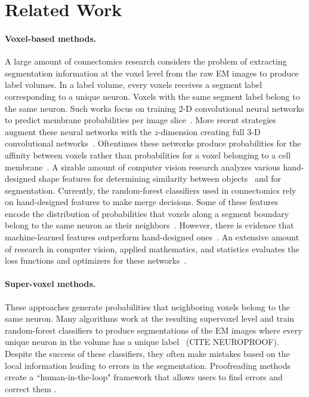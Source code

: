 \section{Related Work}

\paragraph{Voxel-based methods.} 
A large amount of connectomics research considers the problem of extracting segmentation information at the voxel level from the raw EM images to produce label volumes.
In a label volume, every voxels receives a segment label corresponding to a unique neuron.
Voxels with the same segment label belong to the same neuron. 
Such works focus on training 2-D convolutional neural networks to predict membrane probabilities per image slice~\cite{ciresan2012deep,jain2010boundary,amelio_segmentation,rhoananet,kaynig2015large}. 
More recent strategies augment these neural networks with the $z$-dimension creating full 3-D convolutional networks~\cite{lee2015recursive}.
Oftentimes these networks produce probabilities for the affinity between voxels rather than probabilities for a voxel belonging to a cell membrane~\cite{ronneberger2015u}. 
A sizable amount of computer vision research analyzes various hand-designed shape features for determining similarity between objects~\cite{osada2002shape} and for segmentation\cite{conners1984segmentation}. 
Currently, the random-forest classifiers used in connectomics rely on hand-designed features to make merge decisions.
Some of these features encode the distribution of probabilities that voxels along a segment boundary belong to the same neuron as their neighbors~\cite{nunez2014graph,ren2003learning}.
However, there is evidence that machine-learned features outperform hand-designed ones~\cite{bogovic2013learned}.
An extensive amount of research in computer vision, applied mathematics, and statistics evaluates the loss functions and optimizers for these networks~\cite{chatfield2014return,maas2013rectifier,nesterov1983method}. 

\paragraph{Super-voxel methods.} 
These approaches generate probabilities that neighboring voxels belong to the same neuron.
Many algorithms work at the resulting supervoxel level and train random-forest classifiers to produce segmentations of the EM images where every unique neuron in the volume has a unique label~\cite{seymour2016rhoananet,nunez2014graph,parag2017anisotropic,zlateski2015image} (CITE NEUROPROOF). 
Despite the success of these classifiers, they often make mistakes based on the local information leading to errors in the segmentation. 
Proofreading methods create a ``human-in-the-loop" framework that allows users to find errors and correct them \cite{haehn2017scalable,haehn2017guided,haehn2014design,error_correction_using_CNN}. 

